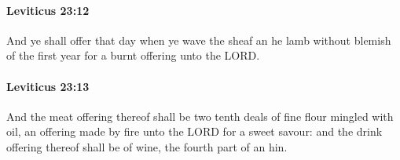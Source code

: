 		\paragraph{Leviticus 23:12} %
			\label{LEVITICUS-23-12}

			And ye shall offer that day when ye wave the sheaf an he lamb without blemish of the first year for a burnt offering unto the LORD.


		\paragraph{Leviticus 23:13} %
			\label{LEVITICUS-23-13}

			And the meat offering thereof shall be two tenth deals of fine flour mingled with oil, an offering made by fire unto the LORD for a sweet savour: and the drink offering thereof shall be of wine, the fourth part of an hin.


